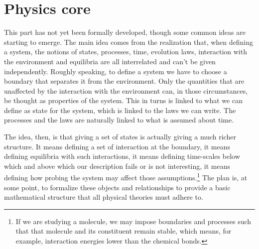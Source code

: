 \documentclass[twocolumn]{article}
\newif\ifextended
\newcommand\fact[2]{\ifextended \emph{#1}. #2 \fi}
\begin{document}
\fact{Recover differential geometry or geometry measure theory} {The idea is to start with finite functions of finite k-dimensional surfaces that have the following properties: they are linear if the surface is broken into disjoint parts (the value for the whole is the sum of the values for the parts) and they respect the limit (the value for the limit surface is the limit of the sequence of values for the surfaces). Under these, and possibly others, conditions we expect these functions to be expressed through an integral of local functions (i.e. k-forms) over infinitesimal surfaces (i.e. k-vectors).}

\section{Physics core}

This part has not yet been formally developed, though some common ideas are starting to emerge. The main idea comes from the realization that, when defining a system, the notions of states, processes, time, evolution laws, interaction with the environment and equilibria are all interrelated and can't be given independently. Roughly speaking, to define a system we have to choose a boundary that separates it from the environment. Only the quantities that are unaffected by the interaction with the environment can, in those circumstances, be thought as properties of the system. This in turns is linked to what we can define as state for the system, which is linked to the laws we can write. The processes and the laws are naturally linked to what is assumed about time.

The idea, then, is that giving a set of states is actually giving a much richer structure. It means defining a set of interaction at the boundary, it means defining equilibria with such interactions, it means defining time-scales below which and above which our description fails or is not interesting, it means defining how probing the system may affect those assumptions.\footnote{If we are studying a molecule, we may impose boundaries and processes such that that molecule and its constituent remain stable, which means, for example, interaction energies lower than the chemical bonds.} The plan is, at some point, to formalize these objects and relationships to provide a basic mathematical structure that all physical theories must adhere to.

\fact{All states are equilibrium states} {In thermodynamics equilibria are simply assumed to exist, without specifying exactly how they are achieved. However, in all physical theories, states are assumed to exist, without specifying what are the conditions upon which the system can be characterized by such states. The idea that, at the very least, all states must be equilibrium states of processes that happen at a faster scale than the processes than we are considering.\footnote{For example, the position and velocity of a book makes sense on the surface of the earth, at a temperature of 293 Kelvin. On the surface of the sun, we would not be able to talk about the position and velocity of a book.} This sets the scale of infinitesimal time intervals.}
\end{document}
